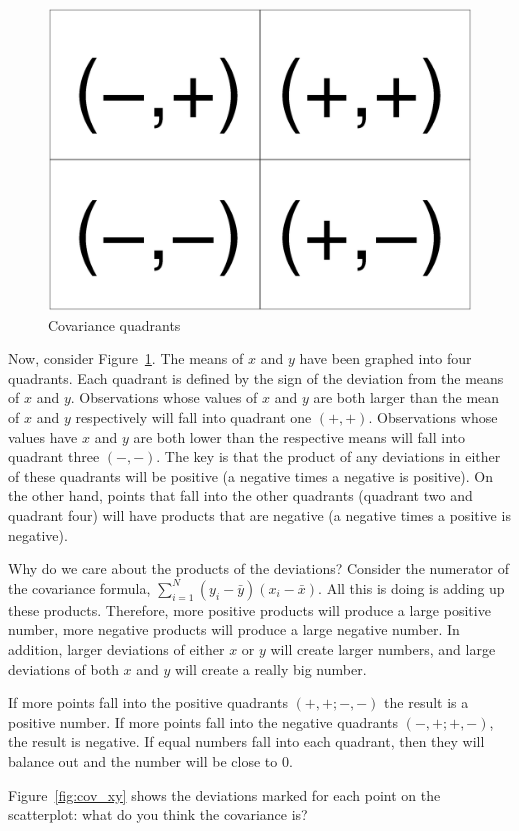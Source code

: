 \begin{figure}
   \centering
   \includegraphics[angle=0,
           width=.75\textwidth]{cov.eps}
   \caption{Covariance quadrants}
  \label{fig:cov}
\end{figure}
Now, consider Figure~\ref{fig:cov}. The means of $x$ and $y$ have been graphed into four quadrants. Each quadrant is defined by the sign of the deviation from the means of $x$ and $y$. Observations whose values of $x$ and $y$ are both larger than the mean of $x$ and $y$ respectively will fall into quadrant one $(+,+)$. Observations whose values have $x$ and $y$ are both lower than the respective means will fall into quadrant three $(-,-)$. The key is that the product of any deviations in either of these quadrants will be positive (a negative times a negative is positive). On the other hand, points that fall into the other quadrants (quadrant two and quadrant four) will have products that are negative (a negative times a positive is negative).

Why do we care about the products of the deviations? Consider the numerator of the covariance formula, $\sum_{i=1}^N\left(y_i-\bar{y}\right)\left(x_i-\bar{x}\right)$. All this is doing is adding up these products. Therefore, more positive products will produce a large positive number, more negative products will produce a large negative number. In addition, larger deviations of either $x$ or $y$ will create larger numbers, and large deviations of both $x$ and $y$ will create a really big number.

If more points fall into the positive quadrants $(+,+; -,-)$ the result is a positive number. If more points fall into the negative quadrants $(-,+;+,-)$, the result is negative. If equal numbers fall into each quadrant, then they will balance out and the number will be close to 0.

Figure~\ref{fig:cov_xy} shows the deviations marked for each point on the scatterplot: what do you think the covariance is?

